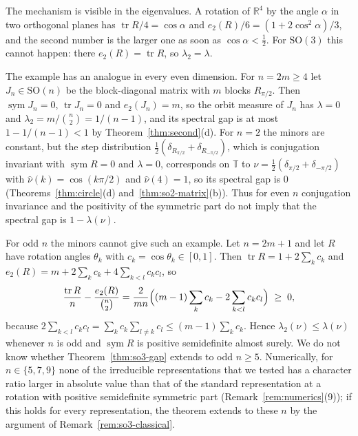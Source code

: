 \documentclass[11pt]{amsart}
\theoremstyle{definition}
\theoremstyle{remark}
\newcommand{\R}{\mathbb{R}}
\newcommand{\T}{\mathbb{T}}
\newcommand{\SO}{\mathrm{SO}}
\newcommand{\tr}{\operatorname{tr}}
\newcommand{\sym}{\operatorname{sym}}
\begin{document}
The mechanism is visible in the eigenvalues.  A rotation of $\R^4$ by the angle $\alpha$ in two
orthogonal planes has $\tr R/4=\cos\alpha$ and $e_2(R)/6=(1+2\cos^2\alpha)/3$, and the second
number is the larger one as soon as $\cos\alpha<\tfrac12$.  For $\SO(3)$ this cannot happen:
there $e_2(R)=\tr R$, so $\lambda_2=\lambda$.

The example has an analogue in every even dimension.  For $n=2m\ge4$ let $J_n\in\SO(n)$ be the
block-diagonal matrix with $m$ blocks $R_{\pi/2}$.  Then $\sym J_n=0$, $\tr J_n=0$ and
$e_2(J_n)=m$, so the orbit measure of $J_n$ has $\lambda=0$ and
$\lambda_2=m/\binom n2=1/(n-1)$, and its spectral gap is at most $1-1/(n-1)<1$ by
Theorem~\ref{thm:second}(d).  For $n=2$ the minors are constant, but the step distribution
$\tfrac12(\delta_{R_{\pi/2}}+\delta_{R_{-\pi/2}})$, which is conjugation invariant with
$\sym R=0$ and $\lambda=0$, corresponds on $\T$ to $\nu=\tfrac12(\delta_{\pi/2}+\delta_{-\pi/2})$
with $\hat\nu(k)=\cos(k\pi/2)$ and $\hat\nu(4)=1$, so its spectral gap is $0$
(Theorems~\ref{thm:circle}(d) and~\ref{thm:so2-matrix}(b)).  Thus for even $n$ conjugation invariance and the positivity of
the symmetric part do not imply that the spectral gap is $1-\lambda(\nu)$.

For odd $n$ the minors cannot give such an example.  Let $n=2m+1$ and let $R$ have rotation
angles $\theta_k$ with $c_k=\cos\theta_k\in[0,1]$.  Then $\tr R=1+2\sum_kc_k$ and
$e_2(R)=m+2\sum_kc_k+4\sum_{k<l}c_kc_l$, so
\[
  \frac{\tr R}{n}-\frac{e_2(R)}{\binom n2}
  =\frac{2}{mn}\Bigl((m-1)\sum_kc_k-2\sum_{k<l}c_kc_l\Bigr)\;\ge\;0,
\]
because $2\sum_{k<l}c_kc_l=\sum_kc_k\sum_{l\ne k}c_l\le(m-1)\sum_kc_k$.  Hence
$\lambda_2(\nu)\le\lambda(\nu)$ whenever $n$ is odd and $\sym R$ is positive semidefinite almost
surely.  We do not know whether Theorem~\ref{thm:so3-gap} extends to odd $n\ge5$.  Numerically,
for $n\in\{5,7,9\}$ none of the irreducible representations that we tested has a character ratio
larger in absolute value than that of the standard representation at a rotation with positive
semidefinite symmetric part (Remark~\ref{rem:numerics}(9)); if this holds for every
representation, the theorem extends to these $n$ by the argument of
Remark~\ref{rem:so3-classical}.
\end{document}
